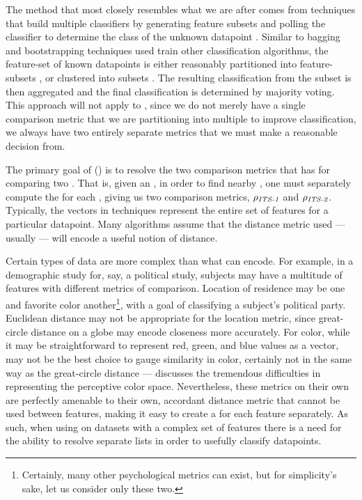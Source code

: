 The method that most closely resembles what we are after comes from techniques that build multiple \kNN{} classifiers by generating feature subsets and polling the classifier to determine the class of the unknown datapoint \cite{DBLP:conf/icml/Bay98, DBLP:journals/ida/Bay99, DBLP:conf/icmlc/WangHWC05}.
Similar to bagging and bootstrapping techniques used train other classification algorithms, the feature-set of known datapoints is either reasonably partitioned into feature-subsets \cite{DBLP:conf/icml/Bay98, DBLP:journals/ida/Bay99}, or clustered into subsets \cite{DBLP:conf/icmlc/WangHWC05}.
The resulting classification from the \kNN{} subset is then aggregated and the final classification is determined by majority voting.
This approach will not apply to \cplop{}, since we do not merely have a single comparison metric that we are partitioning into multiple to improve classification, we always have two entirely separate metrics that we must make a reasonable decision from.

The primary goal of \krapmed{} (\krap{}) is to resolve the two comparison metrics that \cplop{} has for comparing two \isols{}.
That is, given an \isol{}, in order to find nearby \isols{}, one must separately compute the \pearson{} \pcfunclabel{} for each \itsshort{}, giving us two comparison metrics, $\rho{}_{\textit{\textit{ITS}{}-1}{}}$ and $\rho{}_{\textit{\textit{ITS}{}-2}{}}$.
Typically, the vectors in \kNN{} techniques represent the entire set of features for a particular datapoint.
Many \kNN{} algorithms assume that the distance metric used --- usually \euclid{} --- will encode a useful notion of distance.

Certain types of data are more complex than what \euclid{} can encode.
For example, in a demographic study for, say, a political study, subjects may have a multitude of features with different metrics of comparison.
Location of residence may be one and favorite color another\footnote{Certainly, many other psychological metrics can exist, but for simplicity's sake, let us consider only these two.}, with a goal of classifying a subject's political party.
Euclidean distance may not be appropriate for the location metric, since great-circle distance on a globe may encode closeness more accurately.
For color, while it may be straightforward to represent red, green, and blue values as a vector, \euclid{} may not be the best choice to gauge similarity in color, certainly not in the same way as the great-circle distance --- \cite{mcleod2014proof} discusses the tremendous difficulties in representing the perceptive color space.
Nevertheless, these metrics on their own are perfectly amenable to their own, accordant distance metric that cannot be used between features, making it easy to create a \kNN{} for each feature separately.
As such, when using \kNN{} on datasets with a complex set of features there is a need for the ability to resolve separate \kNN{} lists in order to usefully classify datapoints.
